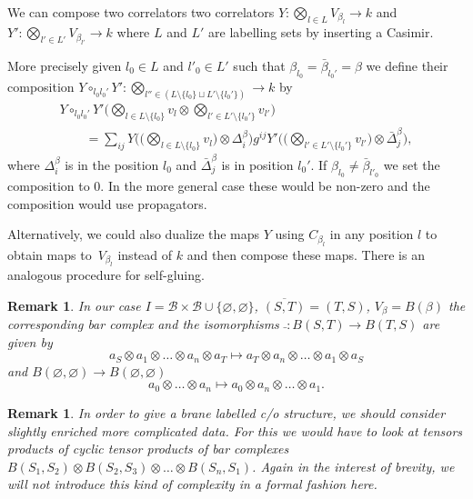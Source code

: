 \documentclass[11pt]{article}
\newtheorem{rmk}[thm]{Remark}
\def\calB{{\mathcal B}}
\def\oto{\otimes \dots \otimes}
\newcommand{\aoa}[2]{a_{#1}\otimes \dots \otimes a_{#2}}
\begin{document}
We can compose two correlators two correlators $Y:\bigotimes_{l \in
L} V_{\beta_l} \to k$ and $Y':\bigotimes_{l'\in L'}
V_{\beta_{l'}}\to k $ where $L$ and $L'$ are labelling sets by
inserting a Casimir.

More precisely given $l_0\in L$ and $l'_0\in L'$ such that
$\beta_{l_0}=\bar\beta_{l_0'}=\beta$ we def\/ine their composition
$Y\circ_{l_0l_0'} Y': \bigotimes_{l''\in (L \setminus \{l_0\} \sqcup
L' \setminus \{l_0'\})} \to k$ by
\begin{gather*}
Y\circ_{l_0l_0'} Y' \Big(\bigotimes_{l\in L\setminus \{l_0\}} v_l\otimes
\bigotimes_{l'\in L'\setminus \{l_0'\}} v_{l'}\Big) \\
\qquad{}
=\sum_{ij}
Y\bigg(\Big(\bigotimes_{l\in L\setminus \{l_0\}} v_l\Big)\otimes
\Delta^{\beta}_i\bigg)g^{ij}Y'\bigg(\Big(\bigotimes_{l'\in L'\setminus
\{l_0'\}} v_{l'}\Big)\otimes \bar \Delta^{\beta}_j\bigg),
\end{gather*}
where $\Delta^{\beta}_i$ is in the position $l_0$ and $\bar
\Delta^{\beta}_j$ is in position $l_0'$. If $\beta_{l_0}\neq
\bar\beta_{l'_0}$ we set the composition to $0$. In the more general
case these would be non-zero and the composition would use
propagators.


Alternatively, we could also dualize the maps $Y$ using
$C_{\beta_l}$ in any position $l$ to obtain maps to~$V_{\beta_l}$
instead of $k$ and then compose these maps. There is an analogous
procedure for self-gluing.

\begin{rmk}
In our case $I=\calB\times \calB\cup \{\varnothing,\varnothing\}$,
$\overline{(S,T)}=(T,S)$, $V_{\beta}=B(\beta)$ the corresponding bar
complex and the isomorphisms $\bar{}:B(S,T)\to B(T,S)$  are given by
\begin{equation*}
a_S\otimes \aoa{1}{n}\otimes a_T\mapsto a_T \otimes
\aoa{n}{1}\otimes a_S
\end{equation*}
and $B(\varnothing,\varnothing)\to B(\varnothing,\varnothing)$
\begin{equation*}
 \aoa{0}{n} \mapsto a_0 \otimes
\aoa{n}{1}.
\end{equation*}
\end{rmk}





\begin{rmk}
In order to give a brane labelled c/o structure, we should consider
slightly enriched more complicated data. For this we would have to
look at tensors products of cyclic tensor products of bar complexes
$B(S_1,S_2)\otimes B(S_2,S_3)\oto B(S_n,S_1)$. Again in the interest
of brevity, we will not introduce this kind of complexity in a
formal fashion here.
\end{rmk}
\end{document}

